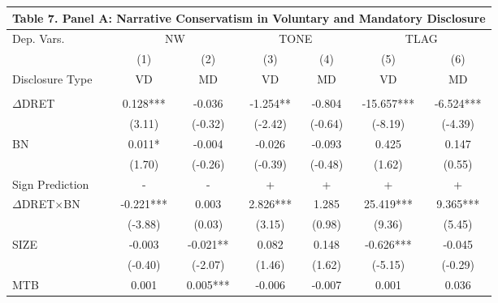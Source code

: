 \begin{table}[htbp] \label{T7PA}
  \centering
    \begin{tabular}{lcccccc}
    \multicolumn{7}{c}{\textbf{Table 7. Panel A: Narrative Conservatism in Voluntary and Mandatory Disclosure}} \\
    \midrule
    \midrule
    Dep. Vars. & \multicolumn{2}{c}{NW} & \multicolumn{2}{c}{TONE} & \multicolumn{2}{c}{TLAG} \\
    \cmidrule{2-7}
      & (1) & \multicolumn{1}{c}{(2)} & (3) & \multicolumn{1}{c}{(4)} & (5) & \multicolumn{1}{c}{(6)} \\
    Disclosure Type & VD & MD & VD & MD & VD & MD \\
    \midrule
      &   & \multicolumn{1}{c}{} &   & \multicolumn{1}{c}{} &   & \multicolumn{1}{c}{} \\
    $\Delta$DRET & 0.128*** & \multicolumn{1}{c}{-0.036} & -1.254** & \multicolumn{1}{c}{-0.804} & -15.657*** & \multicolumn{1}{c}{-6.524***} \\
      & (3.11) & \multicolumn{1}{c}{(-0.32)} & (-2.42) & \multicolumn{1}{c}{(-0.64)} & (-8.19) & \multicolumn{1}{c}{(-4.39)} \\
    BN & 0.011* & \multicolumn{1}{c}{-0.004} & -0.026 & \multicolumn{1}{c}{-0.093} & 0.425 & \multicolumn{1}{c}{0.147} \\
      & (1.70) & \multicolumn{1}{c}{(-0.26)} & (-0.39) & \multicolumn{1}{c}{(-0.48)} & (1.62) & \multicolumn{1}{c}{(0.55)} \\
    \rowcolor[rgb]{ .933,  .925,  .882} Sign Prediction & - & - & + & + & + & + \\
    \rowcolor[rgb]{ .933,  .925,  .882} $\Delta$DRET$\times$BN & -0.221*** & \multicolumn{1}{c}{0.003} & 2.826*** & \multicolumn{1}{c}{1.285} & 25.419*** & \multicolumn{1}{c}{9.365***} \\
    \rowcolor[rgb]{ .933,  .925,  .882}   & (-3.88) & \multicolumn{1}{c}{(0.03)} & (3.15) & \multicolumn{1}{c}{(0.98)} & (9.36) & \multicolumn{1}{c}{(5.45)} \\
    SIZE & -0.003 & \multicolumn{1}{c}{-0.021**} & 0.082 & \multicolumn{1}{c}{0.148} & -0.626*** & \multicolumn{1}{c}{-0.045} \\
      & (-0.40) & \multicolumn{1}{c}{(-2.07)} & (1.46) & \multicolumn{1}{c}{(1.62)} & (-5.15) & \multicolumn{1}{c}{(-0.29)} \\
    MTB & 0.001 & \multicolumn{1}{c}{0.005***} & -0.006 & \multicolumn{1}{c}{-0.007} & 0.001 & \multicolumn{1}{c}{0.036} \\

\end{tabular}
\end{table}
